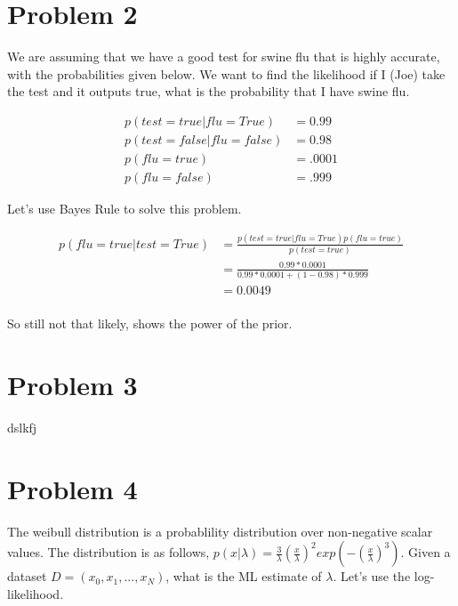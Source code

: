 \documentclass[paper=a4, fontsize=11pt]{scrartcl} %
\begin{document}
\section{Problem 2}
We are assuming that we have a good test for swine flu that is highly accurate, with the probabilities given below.  
We want to find the likelihood if I (Joe) take the test and it outputs true, what is the probability that I have swine flu.

\begin{align}
p(test=true|flu=True) &= 0.99 \\
p(test=false|flu=false) &= 0.98 \\
p(flu=true) &= .0001 \\
p(flu=false) &= .999
\end{align}

Let's use Bayes Rule to solve this problem.

\begin{align}
p(flu=true|test=True) &= \frac{p(test=true|flu=True) p(flu=true)}{p(test=true)} \\
&= \frac{0.99*0.0001}{0.99*0.0001+(1-0.98)*0.999} \\
&= 0.0049 \\
\end{align}


So still not that likely, shows the power of the prior.

\section{Problem 3}

dslkfj
\section{Problem 4}
The weibull distribution is a probablility distribution over non-negative scalar values.  
The distribution is as follows,  $p(x|\lambda) = \frac{3}{\lambda}(\frac{x}{\lambda})^2exp(-(\frac{x}{\lambda})^3)$.
Given a dataset $D = (x_0,x_1,...,x_N)$, what is the ML estimate of $\lambda$.
Let's use the log-likelihood.
\end{document}
